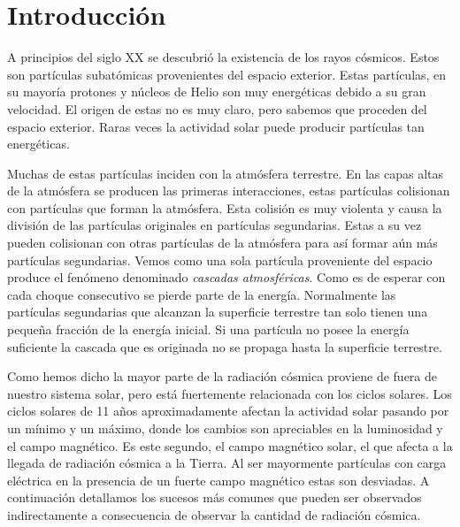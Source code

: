\chapter{Introducción}
\label{cap1}

A principios del siglo XX se descubrió la existencia de los rayos cósmicos. Estos son partículas subatómicas provenientes del espacio exterior. Estas
partículas, en su mayoría protones y núcleos de Helio son muy energéticas debido a su gran velocidad. El origen de estas no es muy claro, pero sabemos
que proceden del espacio exterior. Raras veces la actividad solar puede producir partículas tan energéticas. 
\par
Muchas de estas partículas inciden con la atmósfera terrestre. En las capas altas de la atmósfera se producen las primeras interacciones, estas
partículas colisionan con partículas que forman la atmósfera. Esta colisión es muy violenta y causa la división de las partículas originales en
partículas segundarias. Estas a su vez pueden colisionan con otras partículas de la atmósfera para así formar aún más partículas segundarias. Vemos
como una sola partícula proveniente del espacio produce el fenómeno denominado \emph{cascadas atmosféricas}. Como es de esperar con cada choque
consecutivo se pierde parte de la energía. Normalmente las partículas segundarias que alcanzan la superficie terrestre tan solo tienen una pequeña
fracción de la energía inicial. Si una partícula no posee la energía suficiente la cascada que es originada no se propaga hasta la superficie
terrestre.
\par
Como hemos dicho la mayor parte de la radiación cósmica proviene de fuera de nuestro sistema solar, pero está fuertemente relacionada con los ciclos
solares. Los ciclos solares de 11 años aproximadamente afectan la actividad solar pasando por un mínimo y un máximo, donde los cambios son apreciables
en la luminosidad y el campo magnético. Es este segundo, el campo magnético solar, el que afecta a la llegada de radiación cósmica a la Tierra. Al ser
mayormente partículas con carga eléctrica en la presencia de un fuerte campo magnético estas son desviadas. A continuación detallamos los sucesos más
comunes que pueden ser observados indirectamente a consecuencia de observar la cantidad de radiación cósmica.
